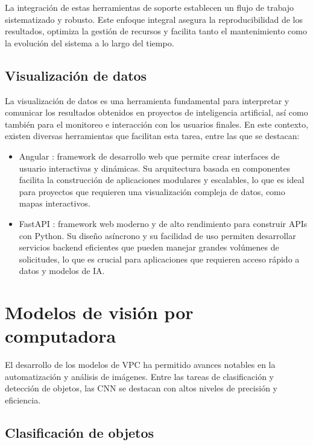 La integración de estas herramientas de soporte establecen un flujo de trabajo sistematizado y robusto. Este enfoque integral asegura la reproducibilidad de los resultados, optimiza la gestión de recursos y facilita tanto el mantenimiento como la evolución del sistema a lo largo del tiempo.

\subsection{Visualización de datos}
\label{sec:visualizacionDatos}

La visualización de datos es una herramienta fundamental para interpretar y comunicar los resultados obtenidos en proyectos de inteligencia artificial, así como también para el monitoreo e interacción con los usuarios finales. En este contexto, existen diversas herramientas que facilitan esta tarea, entre las que se destacan:
\begin{itemize}
	\item Angular \citep{google_angular_nodate}: framework de desarrollo web que permite crear interfaces de usuario interactivas y dinámicas. Su arquitectura basada en componentes facilita la construcción de aplicaciones modulares y escalables, lo que es ideal para proyectos que requieren una visualización compleja de datos, como mapas interactivos.
	\item FastAPI \citep{tiangolo_fastapi_nodate}: framework web moderno y de alto rendimiento para construir APIs con Python. Su diseño asíncrono y su facilidad de uso permiten desarrollar servicios backend eficientes que pueden manejar grandes volúmenes de solicitudes, lo que es crucial para aplicaciones que requieren acceso rápido a datos y modelos de IA.
\end{itemize}

\section{Modelos de visión por computadora}
\label{sec:modelosVisPC}

El desarrollo de los modelos de VPC ha permitido avances notables en la automatización y análisis de imágenes. Entre las tareas de clasificación y detección de objetos, las CNN se destacan con altos niveles de precisión y eficiencia.

\subsection{Clasificación de objetos}

